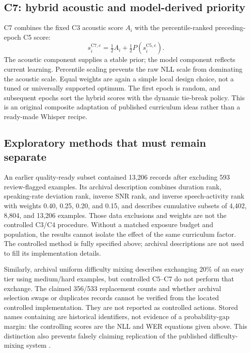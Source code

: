\documentclass[12pt,a4paper]{report}
\newcommand{\code}[1]{\texttt{\detokenize{#1}}}
\begin{document}
\subsection{C7: hybrid acoustic and model-derived priority}

C7 combines the fixed C3 acoustic score $A_i$ with the percentile-ranked preceding-epoch C5 score:
\begin{equation}s_i^{\mathrm{C7},e}=\tfrac12A_i+\tfrac12P(s_i^{\mathrm{C5},e}).\end{equation}
The acoustic component supplies a stable prior; the model component reflects current learning. Percentile scaling prevents the raw NLL scale from dominating the acoustic scale. Equal weights are again a simple local design choice, not a tuned or universally supported optimum. The first epoch is random, and subsequent epochs sort the hybrid scores with the dynamic tie-break policy. This is an original composite adaptation of published curriculum ideas rather than a ready-made Whisper recipe.

\subsection{Exploratory methods that must remain separate}

An earlier quality-ready subset contained 13,206 records after excluding 593 review-flagged examples. Its archival description combines duration rank, speaking-rate deviation rank, inverse SNR rank, and inverse speech-activity rank with weights 0.40, 0.25, 0.20, and 0.15, and describes cumulative subsets of 4,402, 8,804, and 13,206 examples. Those data exclusions and weights are not the controlled C3/C4 procedure. Without a matched exposure budget and population, the results cannot isolate the effect of the same curriculum factor. The controlled method is fully specified above; archival descriptions are not used to fill its implementation details.

Similarly, archival uniform difficulty mixing describes exchanging 20\% of an easy tier using medium/hard examples, but controlled C5--C7 do not perform that exchange. The claimed 356/533 replacement counts and whether archival selection swaps or duplicates records cannot be verified from the located controlled implementation. They are not reported as controlled actions. Stored names containing \code{margin} are historical identifiers, not evidence of a probability-gap margin: the controlling scores are the NLL and WER equations given above. This distinction also prevents falsely claiming replication of the published difficulty-mixing system \citep{Karakasidis2022}.
\end{document}

